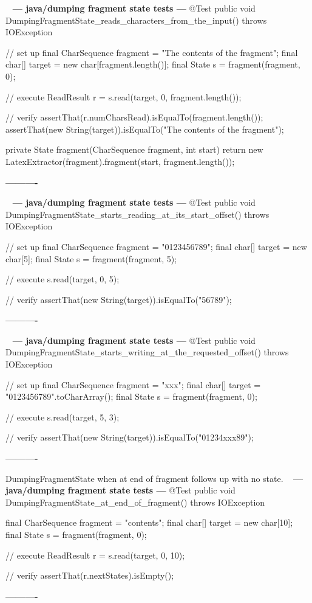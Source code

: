 \documentclass{book}
\newenvironment{chunk}[1]{%
{\ }\newline\noindent%
\hbox{\hskip 2.0cm}{\bf --- #1 ---}%
\verbatim}%                               say exactly what we see
{\endverbatim%
\par{}%
\noindent{}%
\hbox{\hskip 2.0cm}{\bf ----------}%
\par%
\normalsize\noindent}%
\begin{document}
\begin{chunk}{java/dumping fragment state tests}
@Test
public void DumpingFragmentState_reads_characters_from_the_input() throws IOException {
    // set up
    final CharSequence fragment = "The contents of the fragment";
    final char[] target = new char[fragment.length()];
    final State s = fragment(fragment, 0);

    // execute
    ReadResult r = s.read(target, 0, fragment.length());

    // verify
    assertThat(r.numCharsRead).isEqualTo(fragment.length());
    assertThat(new String(target)).isEqualTo("The contents of the fragment");
}

private State fragment(CharSequence fragment, int start) {
    return new LatexExtractor(fragment).fragment(start, fragment.length());
}
\end{chunk}

\begin{chunk}{java/dumping fragment state tests}
@Test
public void DumpingFragmentState_starts_reading_at_its_start_offset() throws IOException {
    // set up
    final CharSequence fragment = "0123456789";
    final char[] target = new char[5];
    final State s = fragment(fragment, 5);

    // execute
    s.read(target, 0, 5);

    // verify
    assertThat(new String(target)).isEqualTo("56789");
}
\end{chunk}

\begin{chunk}{java/dumping fragment state tests}
@Test
public void DumpingFragmentState_starts_writing_at_the_requested_offset() throws IOException {
    // set up
    final CharSequence fragment = "xxx";
    final char[] target = "0123456789".toCharArray();
    final State s = fragment(fragment, 0);

    // execute
    s.read(target, 5, 3);

    // verify
    assertThat(new String(target)).isEqualTo("01234xxx89");
}
\end{chunk}

DumpingFragmentState when at end of fragment follows up with no state.
\begin{chunk}{java/dumping fragment state tests}
@Test
public void DumpingFragmentState_at_end_of_fragment() throws IOException {
    final CharSequence fragment = "contents";
    final char[] target = new char[10];
    final State s = fragment(fragment, 0);

    // execute
    ReadResult r = s.read(target, 0, 10);

    // verify
    assertThat(r.nextStates).isEmpty();
}
\end{chunk}
\end{document}
